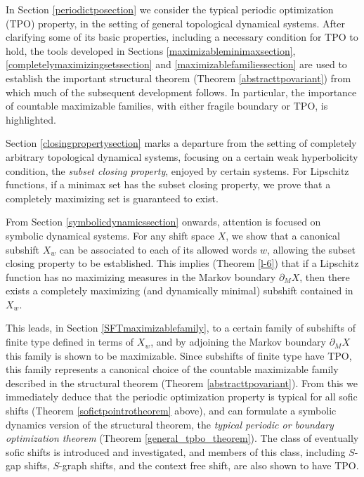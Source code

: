 \documentclass[reqno,11pt]{amsart}
\theoremstyle{definition}
\theoremstyle{remark}
\theoremstyle{remark}
\numberwithin{equation}{section}
\begin{document}
In Section \ref{periodictposection} we consider
the typical periodic optimization (TPO) property, in the setting of general topological dynamical systems.
After clarifying some of its basic properties, including a necessary condition for TPO to hold,
the tools developed in Sections \ref{maximizableminimaxsection}, \ref{completelymaximizingsetssection} and \ref{maximizablefamiliessection}
are used to establish the important structural theorem (Theorem \ref{abstracttpovariant}) from which much of the subsequent development follows.
In particular, the importance of countable maximizable families, with either fragile boundary or TPO, is highlighted.

Section \ref{closingpropertysection}
marks a departure from the setting of completely arbitrary topological dynamical systems, focusing on 
a certain weak hyperbolicity condition, the \emph{subset closing property}, enjoyed by certain systems.
For Lipschitz functions, if a minimax set has the subset closing property,
we prove that a completely maximizing set is guaranteed to exist.

From Section \ref{symbolicdynamicssection} onwards, attention is focused on  
symbolic dynamical systems.
For any
shift space $X$, we show that a canonical 
subshift $X_w$ can be associated to each of its allowed words $w$,
allowing the subset closing property to be established.
This implies (Theorem \ref{l-6})
that if a Lipschitz function
has no maximizing measures in the Markov boundary $\partial_M X$, then there exists a 
completely maximizing
(and dynamically minimal) subshift contained in $X_w$.


This leads, in Section \ref{SFTmaximizablefamily}, to a certain family
of subshifts of finite type defined in terms of $X_w$,
and by adjoining the Markov boundary $\partial_M X$ this family is shown to be maximizable.
Since subshifts of finite type have TPO, 
this family represents a canonical choice of the
countable maximizable family described in the structural theorem (Theorem \ref{abstracttpovariant}).
From this we immediately deduce that 
the periodic optimization property is typical for all
sofic shifts
(Theorem \ref{sofictpointrotheorem} above),
and can formulate a symbolic dynamics version of the structural theorem,
the \emph{typical periodic or boundary optimization theorem} (Theorem \ref{general_tpbo_theorem}).
The class of eventually sofic shifts is introduced and investigated,
and members of this class, including $S$-gap shifts, $S$-graph shifts, and the context free shift, are also shown to have TPO.
\end{document}
